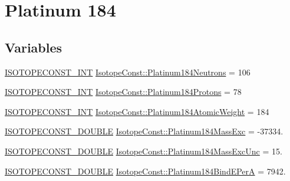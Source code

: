 \hypertarget{group___isotope_const-_platinum-_pt184}{}\section{Platinum 184}
\label{group___isotope_const-_platinum-_pt184}
\subsection*{Variables}
\begin{DoxyCompactItemize}
\item 
\mbox{\hyperlink{group___isotope_const-_macros_ga5f18360b3e99483a35c32d789e62621c}{I\+S\+O\+T\+O\+P\+E\+C\+O\+N\+S\+T\+\_\+\+I\+NT}} \mbox{\hyperlink{group___isotope_const-_platinum-_pt184_ga351535b50a7c6f68a8e8f17a37311bd2}{Isotope\+Const\+::\+Platinum184\+Neutrons}} = 106
\item 
\mbox{\hyperlink{group___isotope_const-_macros_ga5f18360b3e99483a35c32d789e62621c}{I\+S\+O\+T\+O\+P\+E\+C\+O\+N\+S\+T\+\_\+\+I\+NT}} \mbox{\hyperlink{group___isotope_const-_platinum-_pt184_gab85fbbe7917d5f61eae20d3f76cd173d}{Isotope\+Const\+::\+Platinum184\+Protons}} = 78
\item 
\mbox{\hyperlink{group___isotope_const-_macros_ga5f18360b3e99483a35c32d789e62621c}{I\+S\+O\+T\+O\+P\+E\+C\+O\+N\+S\+T\+\_\+\+I\+NT}} \mbox{\hyperlink{group___isotope_const-_platinum-_pt184_ga8a902720bac5a94bb5fed3274345b195}{Isotope\+Const\+::\+Platinum184\+Atomic\+Weight}} = 184
\item 
\mbox{\hyperlink{group___isotope_const-_macros_ga8f45a7272ce02c0b4c65c44636ed719a}{I\+S\+O\+T\+O\+P\+E\+C\+O\+N\+S\+T\+\_\+\+D\+O\+U\+B\+LE}} \mbox{\hyperlink{group___isotope_const-_platinum-_pt184_ga5bd53a127442eafdd676686c7328a7f1}{Isotope\+Const\+::\+Platinum184\+Mass\+Exc}} = -\/37334.
\item 
\mbox{\hyperlink{group___isotope_const-_macros_ga8f45a7272ce02c0b4c65c44636ed719a}{I\+S\+O\+T\+O\+P\+E\+C\+O\+N\+S\+T\+\_\+\+D\+O\+U\+B\+LE}} \mbox{\hyperlink{group___isotope_const-_platinum-_pt184_ga787375a880b80f6425087beb63e33d12}{Isotope\+Const\+::\+Platinum184\+Mass\+Exc\+Unc}} = 15.
\item 
\mbox{\hyperlink{group___isotope_const-_macros_ga8f45a7272ce02c0b4c65c44636ed719a}{I\+S\+O\+T\+O\+P\+E\+C\+O\+N\+S\+T\+\_\+\+D\+O\+U\+B\+LE}} \mbox{\hyperlink{group___isotope_const-_platinum-_pt184_gaf615c92936f4de64fc7411009919dca9}{Isotope\+Const\+::\+Platinum184\+Bind\+E\+PerA}} = 7942.
\item 

\end{DoxyCompactItemize}
